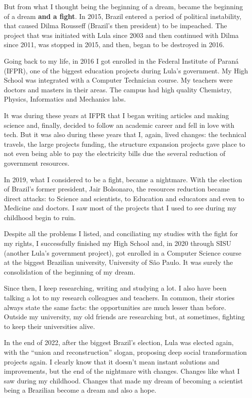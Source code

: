 But from what I thought being the beginning of a dream, became the beginning of a dream \textbf{and a fight}. In 2015, Brazil entered a period of political instability, that caused Dilma Rousseff (Brazil's then president) to be impeached. The project that was initiated with Lula since 2003 and then continued with Dilma since 2011, was stopped in 2015, and then, began to be destroyed in 2016.

Going back to my life, in 2016 I got enrolled in the Federal Institute of Paran\'a (IFPR), one of the biggest education projects during Lula's government. My High School was integrated with a Computer Technician course. My teachers were doctors and masters in their areas. The campus had high quality Chemistry, Physics, Informatics and Mechanics labs.

It was during these years at IFPR that I began writing articles and making science and, finally, decided to follow an academic career and fell in love with tech. But it was also during these years that I, again, lived changes: the technical travels, the large projects funding, the structure expansion projects gave place to not even being able to pay the electricity bills due the several reduction of government resources.

In 2019, what I considered to be a fight, became a nightmare. With the election of Brazil's former president, Jair Bolsonaro, the resources reduction became direct attacks: to Science and scientists, to Education and educators and even to Medicine and doctors. I saw most of the projects that I used to see during my childhood begin to ruin.

Despite all the problems I listed, and conciliating my studies with the fight for my rights, I successfully finished my High School and, in 2020 through SISU (another Lula's government project), got enrolled in a Computer Science course at the biggest Brazilian university, University of S\~ao Paulo. It was surely the consolidation of the beginning of my dream.

Since then, I keep researching, writing and studying a lot. I also have been talking a lot to my research colleagues and teachers. In common, their stories always state the same facts: the opportunities are much lesser than before. Outside my university, my old friends are researching but, at sometimes, fighting to keep their universities alive.

In the end of 2022, after the biggest Brazil's election, Lula was elected again, with the ``union and reconstruction'' slogan, proposing deep social transformation projects again. I clearly know that it doesn't mean instant solutions and improvements, but the end of the nightmare with changes. Changes like what I saw during my childhood. Changes that made my dream of becoming a scientist being a Brazilian become a dream and also a hope.
